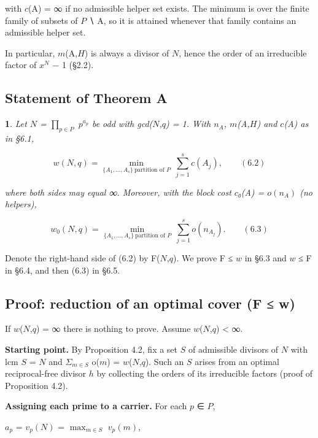 \documentclass[pdflatex,sn-mathphys-num]{sn-jnl}
\theoremstyle{thmstyleone}
\newcommand{\thmxname}{}
\newtheorem*{thmxinner}{\thmxname}
\newenvironment{thmx}[1]{\renewcommand{\thmxname}{#1}\begin{thmxinner}}{\end{thmxinner}}
\theoremstyle{thmstylethree}
\begin{document}
with \(c\)(A) = ∞ if no admissible helper set exists. The minimum is over the finite family of subsets of \(P\) ∖ A, so it is attained whenever that family contains an admissible helper set.

In particular, \(m\)(A,\(H\)) is always a divisor of \(N\), hence the order of an irreducible factor of \(x^N\) − 1 (§2.2).

\subsection{Statement of Theorem A}

\begin{thmx}{Theorem A (support-reduction formula)}

Let \(N\) = \(∏_{p∈P}\) \(p^{a_p}\) be odd with gcd(\(N\),\(q\)) = 1. With \(n_A\), \(m\)(A,\(H\)) and \(c\)(A) as in §6.1,

\[w(N,q)=\min_{\{A_1,\ldots,A_s\}\ \text{partition of }P}\ \sum_{j=1}^{s}c(A_j),\qquad (6.2)\]

where both sides may equal ∞. Moreover, with the block cost \(c\)₀(A) = \(o(n_A)\) (no helpers),

\[w_0(N,q)=\min_{\{A_1,\ldots,A_s\}\ \text{partition of }P}\ \sum_{j=1}^{s}o(n_{A_j}).\qquad (6.3)\]

\end{thmx}

Denote the right-hand side of (6.2) by F(\(N\),\(q\)). We prove F ≤ \(w\) in §6.3 and \(w\) ≤ F in §6.4, and then (6.3) in §6.5.

\subsection{Proof: reduction of an optimal cover (F ≤ w)}

If \(w\)(\(N\),\(q\)) = ∞ there is nothing to prove. Assume \(w\)(\(N\),\(q\)) \textless{} ∞.

\textbf{Starting point.} By Proposition 4.2, fix a set \(S\) of admissible divisors of \(N\) with lcm \(S\) = \(N\) and \(Σ_{m∈S}\) o(\(m\)) = \(w\)(\(N\),\(q\)). Such an \(S\) arises from an optimal reciprocal-free divisor \(h\) by collecting the orders of its irreducible factors (proof of Proposition 4.2).

\textbf{Assigning each prime to a carrier.} For each \(p\) ∈ \(P\),

\begin{center}\(a_p\) = \(v_p(N)\) = \(\operatorname{max}_{m∈S}\) \(v_p(m)\),\end{center}
\end{document}
